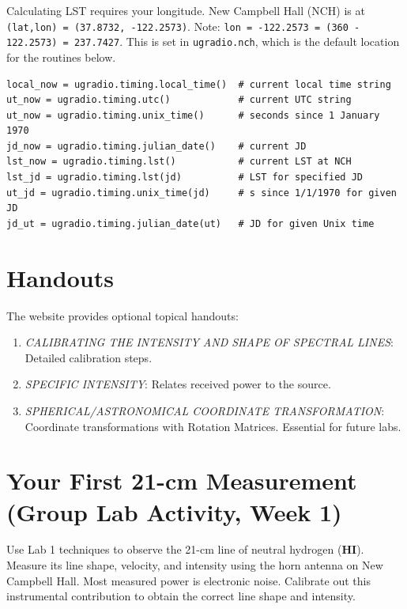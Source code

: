 \documentclass[11pt,preprint]{aastex}
\begin{document}
Calculating LST requires your longitude.
New Campbell Hall (NCH) is at {\tt (lat,lon) = (37.8732, -122.2573)}.
Note: {\tt lon = -122.2573 = (360 - 122.2573) = 237.7427}. 
This is set in {\tt ugradio.nch}, which is the default location for the routines below.

\begin{verbatim}
local_now = ugradio.timing.local_time()  # current local time string
ut_now = ugradio.timing.utc()            # current UTC string
ut_now = ugradio.timing.unix_time()      # seconds since 1 January 1970
jd_now = ugradio.timing.julian_date()    # current JD
lst_now = ugradio.timing.lst()           # current LST at NCH
lst_jd = ugradio.timing.lst(jd)          # LST for specified JD
ut_jd = ugradio.timing.unix_time(jd)     # s since 1/1/1970 for given JD
jd_ut = ugradio.timing.julian_date(ut)   # JD for given Unix time
\end{verbatim}


\section{Handouts} \label{handouts}

\noindent
The website provides optional topical handouts:

\begin{enumerate}
    \item {\it CALIBRATING THE INTENSITY AND SHAPE OF SPECTRAL LINES}:
    Detailed calibration steps.

    \item {\it SPECIFIC INTENSITY}:
    Relates received power to the source.

    \item {\it SPHERICAL/ASTRONOMICAL COORDINATE TRANSFORMATION}:
    Coordinate transformations with Rotation Matrices.
    Essential for future labs.
\end{enumerate}


\section{Your First 21-cm Measurement (Group Lab Activity, Week 1)}
\label{radioastro}

\noindent
Use Lab 1 techniques to observe the 21-cm line of neutral hydrogen ({\bf HI}).
Measure its line shape, velocity, and intensity using the horn antenna on
New Campbell Hall.
Most measured power is electronic noise.
Calibrate out this instrumental contribution to obtain the correct line
shape and intensity.
\end{document}

